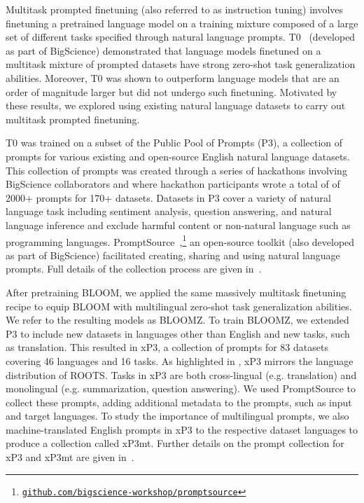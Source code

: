 \documentclass[twoside,11pt]{article}
\begin{document}
Multitask prompted finetuning (also referred to as instruction tuning) involves finetuning a pretrained language model on a training mixture composed of a large set of different tasks specified through natural language prompts.
T0~\citep{sanh2022multitask} (developed as part of BigScience) demonstrated that language models finetuned on a multitask mixture of prompted datasets have strong zero-shot task generalization abilities.
Moreover, T0 was shown to outperform language models that are an order of magnitude larger but did not undergo such finetuning. Motivated by these results, we explored using existing natural language datasets to carry out multitask prompted finetuning. 

T0 was trained on a subset of the Public Pool of Prompts (P3), a collection of prompts for various existing and open-source English natural language datasets. This collection of prompts was created through a series of hackathons involving BigScience collaborators and where hackathon participants wrote a total of of 2000+ prompts for 170+ datasets.
Datasets in P3 cover a variety of natural language task including sentiment analysis, question answering, and natural language inference and exclude harmful content or non-natural language such as programming languages. PromptSource~\citep{bach2022promptsource},\footnote{\href{https://github.com/bigscience-workshop/promptsource}{\texttt{github.com/bigscience-workshop/promptsource}}} an open-source toolkit (also developed as part of BigScience) facilitated creating, sharing and using natural language prompts. Full details of the collection process are given in~\citep{sanh2022multitask,bach2022promptsource}.  

After pretraining BLOOM, we applied the same massively multitask finetuning recipe to equip BLOOM with multilingual zero-shot task generalization abilities. We refer to the resulting models as BLOOMZ. To train BLOOMZ, we extended P3 to include new datasets in languages other than English and new tasks, such as translation. This resulted in xP3, a collection of prompts for 83 datasets covering 46 languages and 16 tasks. As highlighted in , xP3 mirrors the language distribution of ROOTS. Tasks in xP3 are both cross-lingual (e.g. translation) and monolingual (e.g. summarization, question answering). We used PromptSource to collect these prompts, adding additional metadata to the prompts, such as input and target languages. To study the importance of multilingual prompts, we also machine-translated English prompts in xP3 to the respective dataset languages to produce a collection called xP3mt. Further details on the prompt collection for xP3 and xP3mt are given in~\cite{muennighoff2022crosslingual}.
\end{document}
